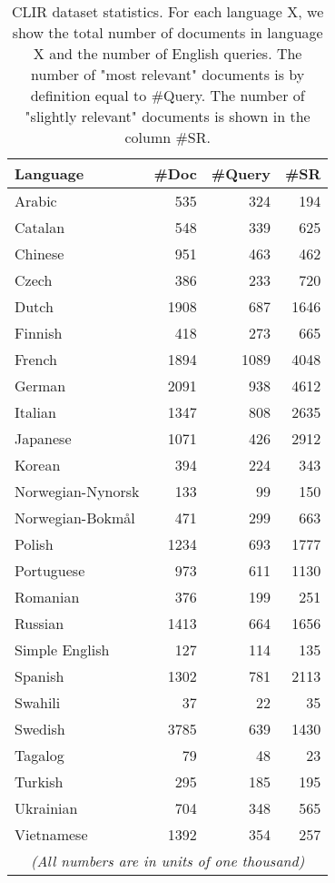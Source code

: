 \documentclass[11pt,a4paper]{article}
\begin{document}
\begin{table}[t]
	\begin{center}	
\begin{tabular}{| l | r | r | r | }
\hline \bf Language & \bf \#Doc  & \bf \#Query & \bf \#SR  \\\hline
Arabic & 535  &  324 & 194 \\
Catalan & 548  & 339 & 625 \\
Chinese & 951 & 463 & 462 \\
Czech & 386  & 233  & 720 \\
Dutch & 1908  & 687 & 1646 \\
Finnish & 418 & 273 & 665 \\
French & 1894 & 1089 & 4048 \\
German & 2091  & 938 & 4612 \\
Italian & 1347 & 808 & 2635 \\
Japanese & 1071  & 426 & 2912 \\
Korean & 394  & 224 & 343 \\
Norwegian-Nynorsk & 133 & 99 & 150 \\
Norwegian-Bokm{\aa}l & 471 & 299  & 663 \\
Polish & 1234 & 693 & 1777 \\
Portuguese & 973 & 611 & 1130 \\
Romanian & 376 & 199 & 251 \\
Russian & 1413 & 664 & 1656 \\
Simple English & 127 & 114 & 135 \\
Spanish & 1302  & 781 & 2113 \\
Swahili & 37 & 22 & 35 \\
Swedish & 3785 & 639 & 1430 \\
Tagalog & 79 & 48 & 23 \\
Turkish & 295 & 185 & 195 \\
Ukrainian & 704  & 348 & 565 \\
Vietnamese & 1392  & 354 & 257 \\
\multicolumn{4}{|c|}{\textit{(All numbers are in units of one thousand)}} \\
\hline
\end{tabular}
\caption{\label{tab:data} CLIR dataset statistics. For each language X, we show the total number of documents in language X and the number of English queries. The number of "most relevant" documents is by definition equal to \#Query. The number of "slightly relevant" documents is shown in the column \#SR.}
\end{center}
\end{table}
\end{document}
